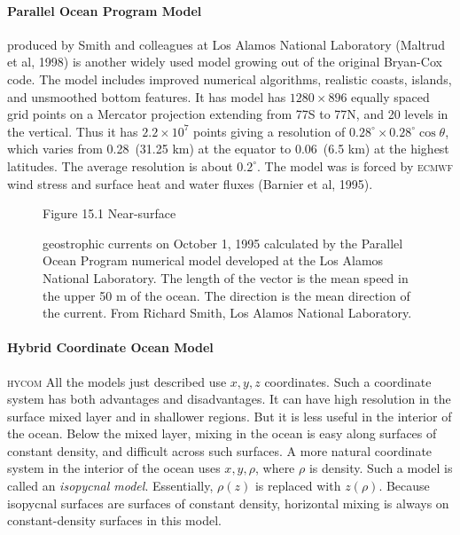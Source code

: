 \paragraph{Parallel Ocean Program Model} produced by Smith and colleagues at Los Alamos National Laboratory (Maltrud et al, 1998) is another widely used model growing out of the original Bryan-Cox code. The model includes improved numerical algorithms, realistic coasts, islands, and unsmoothed bottom features. It has model has $1280 \times 896$ equally spaced grid points on a Mercator projection extending from 77\degrees S to 77\degrees N, and 20 levels in the vertical. Thus it has $2.2 \times 10^{7}$ points giving a resolution of $0.28^{\circ} \times 0.28^{\circ} \cos \theta $, which varies from 0.28\degrees\ (31.25 km) at the equator to 0.06\degrees\ (6.5 km) at the highest latitudes. The average resolution is about $0.2^{\circ}$. The model was is forced by \textsc{ecmwf} wind stress and surface heat and water fluxes (Barnier et al, 1995).

\begin{figure}[t!]
\footnotesize
Figure 15.1 Near-surface \rule{0mm}{1ex}geostrophic currents on October 1, 1995 calculated by the Parallel Ocean
Program numerical model developed at the Los Alamos National Laboratory. The length of the
vector is the mean speed in the upper 50 m of the ocean. The direction is the mean direction
of the current. From Richard Smith, Los Alamos National Laboratory.
\vspace{-4ex}
\label{fig:model_out}
\end{figure}

\paragraph{Hybrid Coordinate Ocean Model} \textsc{hycom} All the models just described use $x, y, z$ coordinates. Such a coordinate system has both advantages and disadvantages. It can have high resolution in the surface mixed layer and in shallower regions. But it is less useful in the interior of the ocean. Below the mixed layer, mixing in the ocean is easy along surfaces of constant density, and difficult across such surfaces. A more natural coordinate system in the interior of the ocean uses $x, y, \rho$, where $\rho$ is density. Such a model is called an \textit{isopycnal model}. Essentially, $\rho (z)$ is replaced with $z (\rho )$. Because isopycnal surfaces are surfaces of constant density, horizontal mixing is always on constant-density surfaces in this model.

